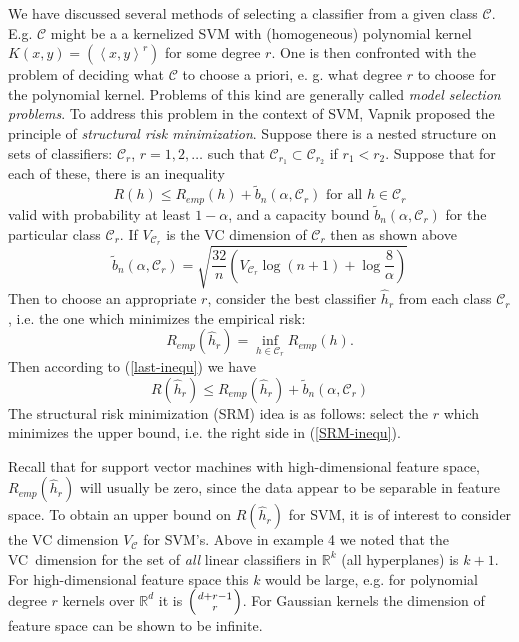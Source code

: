 \documentclass[11pt,twoside]{article}%
\theoremstyle{change}
\begin{document}
\begin{mycomments}
We have discussed several methods of selecting a classifier from a given class
$\mathcal{C}$. E.g. $\mathcal{C}$ might be a a kernelized SVM with
(homogeneous) polynomial kernel $K(x,y)=\left(  \left\langle x,y\right\rangle
^{r}\right)  $ for some degree $r$. One is then confronted with the problem of
deciding what $\mathcal{C}$ to choose a priori, e. g. what degree $r$ to
choose for the polynomial kernel. Problems of this kind are generally called
\textit{model selection problems}. To address this problem in the context of
SVM, Vapnik proposed the principle of \textit{structural risk minimization}.
Suppose there is a nested structure on sets of classifiers: $\mathcal{C}_{r}$,
$r=1,2,\ldots$ such that $\mathcal{C}_{r_{1}}\subset\mathcal{C}_{r_{2}}$ if
$r_{1}<r_{2}$. Suppose that for each of these, there is an inequality
\begin{equation}
R(h)\leq R_{emp}(h)+\tilde{b}_{n}(\alpha,\mathcal{C}_{r})\text{ for all }%
h\in\mathcal{C}_{r}\label{last-inequ}%
\end{equation}
valid with probability at least $1-\alpha$, and a capacity bound $\tilde
{b}_{n}(\alpha,\mathcal{C}_{r})$ for the particular class $\mathcal{C}_{r}$.
If $V_{\mathcal{C}_{r}}$ is the VC dimension of $\mathcal{C}_{r}$ then as
shown above
\[
\tilde{b}_{n}(\alpha,\mathcal{C}_{r})=\sqrt{\frac{32}{n}\left(  V_{\mathcal{C}%
_{r}}\log(n+1)+\log\frac{8}{\alpha}\right)  }%
\]
Then to choose an appropriate $r$, consider the best classifier $\hat{h}_{r}$
from each class $\mathcal{C}_{r}$, i.e. the one which minimizes the empirical
risk:%
\[
R_{emp}(\hat{h}_{r})=\inf_{h\in\mathcal{C}_{r}}R_{emp}(h).
\]
Then according to (\ref{last-inequ}) we have
\begin{equation}
R(\hat{h}_{r})\leq R_{emp}(\hat{h}_{r})+\tilde{b}_{n}(\alpha,\mathcal{C}%
_{r})\label{SRM-inequ}%
\end{equation}
The structural risk minimization (SRM) idea is as follows: select the $r$
which minimizes the upper bound, i.e. the right side in (\ref{SRM-inequ}).

Recall that for support vector machines with high-dimensional feature space,
$R_{emp}(\hat{h}_{r})$ will usually be zero, since the data appear to be
separable in feature space. To obtain an upper bound on $R(\hat{h}_{r})$ for
SVM, it is of interest to consider the VC dimension $V_{\mathcal{C}}$ for
SVM's. Above in example 4 we noted that the VC\ dimension for the set of
\textit{all }linear classifiers in $\mathbb{R}^{k}$ (all hyperplanes) is $k+1
$. For high-dimensional feature space this $k$ would be large, e.g. for
polynomial degree $r$ kernels over $\mathbb{R}^{d}$ it is $\left(
\genfrac{}{}{0pt}{}{d+r-1}{r}%
\right)  $. For Gaussian kernels the dimension of feature space can be shown
to be infinite.


\end{mycomments}
\end{document}
